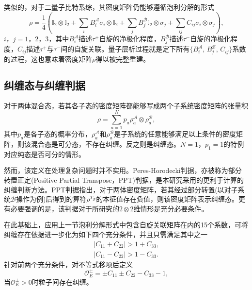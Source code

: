 类似的，对于二量子比特系综，其密度矩阵仍能够遵循泡利分解的形式\cite{ref13}
\begin{equation*}
\rho=\frac{1}{4} \left( \mathbb{I}_2\otimes \mathbb{I}_2+\sum_{i}B_i^{\mathcal{A}} \sigma_i\otimes \mathbb{I}_2+\sum_{j}B_{j}^{\mathcal{B}} \mathbb{I}_2\otimes \sigma_j+\sum_{ij}C_{ij}\sigma_i\otimes\sigma_j \right)\text{,}
\tag{2.3}
\end{equation*}
\noindent $ i$，$ j=1$，$ 2$，$3 $，其中$B_{i}^{\mathcal{A}}$描述$\tau^+$自旋的净极化程度，$B_{j}^{\mathcal{B}}$描述$\tau^-$自旋的净极化程度，$C_{ij}$描述$\tau^+$与$\tau^-$间的自旋关联。量子层析过程就是定下所有$\{ B_{i}^{\mathcal{A}}\text{, } B_{j}^{\mathcal{B}}\text{, }C_{ij} \}$系数的过程，这也意味着密度矩阵$\rho$得以被完整重建。

\subsection{纠缠态与纠缠判据}
\label{sec:twoponepthree}

对于两体混合态，若其各子态的密度矩阵都能够写成两个子系统密度矩阵的张量积
\begin{equation*}
\rho=\sum_{a=1}^{N}p_a\rho_{a}^{\mathcal{A}}\otimes \rho_{a}^{\mathcal{B}}\text{,}
\tag{2.4}
\end{equation*}
\noindent 其中$p_a$是各子态的概率分布，$\rho_{a}^{\mathcal{A}}$和$\rho_{a}^{\mathcal{B}}$是子系统的任意能够满足以上条件的密度矩阵，则该混合态是可分态，不存在纠缠。反之则是纠缠态。$N=1$，$p_1=1$的特例对应纯态是否可分的情形。

然而，该定义在处理复杂问题时并不实用。Peres-Horodecki判据，亦被称为部分转置正定(Positive Partial Transpose，PPT)判据\cite{ref14, ref15}，是本研究采用的更利于计算的纠缠判断方法。PPT判据指出，对于两体密度矩阵，若其经过部分转置(以对子系统$\mathcal{B}$操作为例)后得到的算符$\rho^{T_{\mathcal{B}}}$的本征值存在负值，则该密度矩阵表示纠缠态。更有必要强调的是，该判据对于所研究的$2\otimes2$维情形是充分必要条件。

在此基础上，应用上一节泡利分解形式中包含自旋关联矩阵在内的15个系数，可将纠缠存在依据进一步化为如下四个充分条件，并且只需满足其中之一\cite{ref16}
\begin{equation*}
\begin{aligned}
\lvert C_{11}+C_{22} \rvert >1+C_{33}\text{,}\\
\lvert C_{11}-C_{22} \rvert >1-C_{33}\text{.}
\end{aligned}
\tag{2.5}
\end{equation*}
针对前两个充分条件，对不等式移项后定义
\begin{equation*}
\mathcal{O}_{E}^{\pm}=\pm C_{11}\pm C_{22}-C_{33}-1\text{,}
\tag{2.6}
\end{equation*}
\noindent 当$\mathcal{O}_{E}^{\pm}>0$时粒子间存在纠缠。

